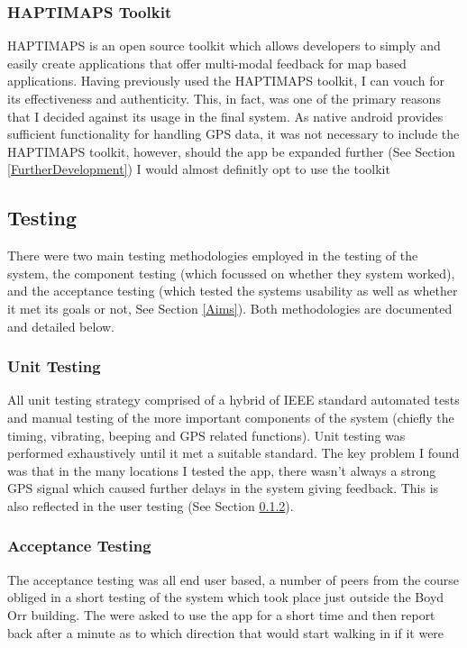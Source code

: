 \documentclass[12pt]{article} %
\begin{document}
\subsubsection{HAPTIMAPS Toolkit}
HAPTIMAPS is an open source toolkit which allows developers to simply and easily create
applications that offer multi-modal feedback for map based applications. Having previously used the
HAPTIMAPS toolkit, I can vouch for its effectiveness and authenticity. This, in fact, was one of
the primary reasons that I decided against its usage in the final system. As native android
provides sufficient functionality for handling GPS data, it was not necessary to include the
HAPTIMAPS toolkit, however, should the app be expanded further (See Section 
\ref{FurtherDevelopment}) I would almost definitly opt to use the toolkit
\subsection{Testing}
\label{Testing}

There were two main testing methodologies employed in the testing of the system, the component
testing (which focussed on whether they system worked), and the acceptance testing (which tested
the systems usability as well as whether it met its goals or not, See Section \ref{Aims}). Both
methodologies are documented and detailed below.

\subsubsection{Unit Testing}

All unit testing strategy comprised of a hybrid of IEEE standard automated tests and manual testing
of the more important components of the system (chiefly the timing, vibrating, beeping and GPS
related functions). Unit testing was performed exhaustively until it met a suitable standard. The
key problem I found was that in the many locations I tested the app, there wasn't always a strong
GPS signal which caused further delays in the system giving feedback. This is also reflected in the
user testing (See Section \ref{Acceptance}).
\subsubsection{Acceptance Testing}
\label{Acceptance}

The acceptance testing was all end user based, a number of peers from the course obliged in a short
testing of the system which took place just outside the Boyd Orr building. The were asked to use
the app for a short time and then report back after a minute as to which direction that would start
walking in if it were 
\end{document}
